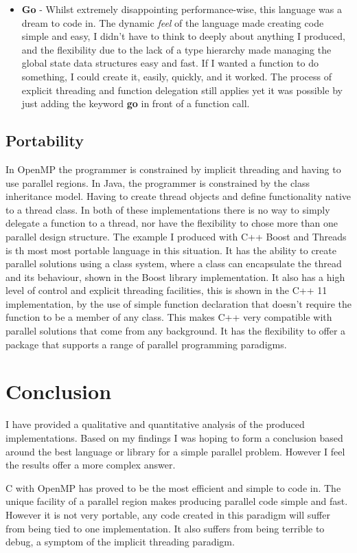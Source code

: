 \documentclass[11pt]{article} %
\begin{document}
\begin{itemize}
\item {\bf Go} - Whilst extremely disappointing performance-wise, this language was a dream to code in. The dynamic {\it feel} of the language made creating code simple and easy, I didn't have to think to deeply about anything I produced, and the flexibility due to the lack of a type hierarchy made managing the global state data structures easy and fast. If I wanted a function to do something, I could create it, easily, quickly, and it worked. The process of explicit threading and function delegation still applies yet it was possible by just adding the keyword {\bf go} in front of a function call. 
\end{itemize}
\subsection{Portability}
In OpenMP the programmer is constrained by implicit threading and having to use parallel regions. In Java, the programmer is constrained by the class inheritance model. Having to create thread objects and define functionality native to a thread class. In both of these implementations there is no way to simply delegate a function to a thread, nor have the flexibility to chose more than one parallel design structure. The example I produced with C++ Boost and Threads is th most most portable language in this situation. It has the ability to create parallel solutions using a class system, where a class can encapsulate the thread and its behaviour, shown in the Boost library implementation. It also has a high level of control and explicit threading facilities, this is shown in the C++ 11 implementation, by the use of simple function declaration that doesn't require the function to be a member of any class. This makes C++ very compatible with parallel solutions that come from any background. It has the flexibility to offer a package that supports a range of parallel programming paradigms.
\section{Conclusion}
I have provided a qualitative and quantitative analysis of the produced implementations. Based on my findings I was hoping to form a conclusion based around the best language or library for a simple parallel problem. However I feel the results offer a more complex answer.

C with OpenMP has proved to be the most efficient and simple to code in. The unique facility of a parallel region makes producing parallel code simple and fast. However it is not very portable, any code created in this paradigm will suffer from being tied to one implementation. It also suffers from being terrible to debug, a symptom of the implicit threading paradigm.
\end{document}
